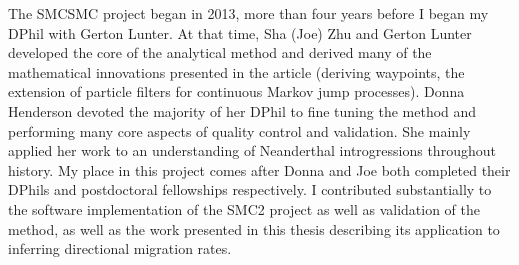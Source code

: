The SMCSMC project began in 2013, more than four years before I began my DPhil with Gerton Lunter. At that time, Sha (Joe) Zhu and Gerton Lunter developed the core of the analytical method and derived many of the mathematical innovations presented in the article (deriving waypoints, the extension of particle filters for continuous Markov jump processes). Donna Henderson devoted the majority of her DPhil to fine tuning the method and performing many core aspects of quality control and validation. She mainly applied her work to an understanding of Neanderthal introgressions throughout history. My place in this project comes after Donna and Joe both completed their DPhils and postdoctoral fellowships respectively. I contributed substantially to the software implementation of the SMC2 project as well as validation of the method, as well as the work presented in this thesis describing its application to inferring directional migration rates.